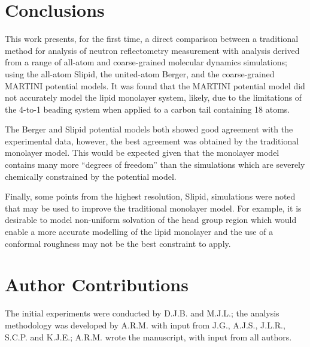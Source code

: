 \documentclass[amsmath,amssymb,twocolumn,superscriptaddress]{revtex4-1}
\begin{document}
\section{Conclusions}
This work presents, for the first time, a direct comparison between a traditional method for analysis of neutron reflectometry measurement with analysis derived from a range of all-atom and coarse-grained molecular dynamics simulations; using the all-atom Slipid, the united-atom Berger, and the coarse-grained MARTINI potential models.
It was found that the MARTINI potential model did not accurately model the lipid monolayer system, likely, due to the limitations of the 4-to-1 beading system when applied to a carbon tail containing 18 atoms.

The Berger and Slipid potential models both showed good agreement with the experimental data, however, the best agreement was obtained by the traditional monolayer model.
This would be expected given that the monolayer model contains many more ``degrees of freedom'' than the simulations which are severely chemically constrained by the potential model.

Finally, some points from the highest resolution, Slipid, simulations were noted that may be used to improve the traditional monolayer model.
For example, it is desirable to model non-uniform solvation of the head group region which would enable a more accurate modelling of the lipid monolayer and the use of a conformal roughness may not be the best constraint to apply.

\section{Author Contributions}
The initial experiments were conducted by D.J.B. and M.J.L.; the analysis methodology was developed by A.R.M. with input from J.G., A.J.S., J.L.R., S.C.P. and K.J.E.; A.R.M. wrote the manuscript, with input from all authors.



\end{document}
